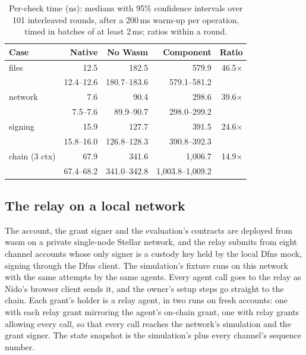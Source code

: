 \begin{table}[t]
\caption{Per-check time (ns): medians with 95\% confidence intervals over 101
interleaved rounds, after a 200\,ms warm-up per operation, timed in batches of
at least 2\,ms; ratios within a round.}\label{tab:host-cost}
\small
\setlength\tabcolsep{4pt}
\begin{tabular}{@{}lrrrr@{}}
\toprule
\textbf{Case} & \textbf{Native} & \textbf{No Wasm} & \textbf{Component} & \textbf{Ratio} \\
\midrule
files & 12.5 & 182.5 & 579.9 & 46.5$\times$ \\
 & {\scriptsize 12.4--12.6} & {\scriptsize 180.7--183.6} & {\scriptsize 579.1--581.2} & \\
network & 7.6 & 90.4 & 298.6 & 39.6$\times$ \\
 & {\scriptsize 7.5--7.6} & {\scriptsize 89.9--90.7} & {\scriptsize 298.0--299.2} & \\
signing & 15.9 & 127.7 & 391.5 & 24.6$\times$ \\
 & {\scriptsize 15.8--16.0} & {\scriptsize 126.8--128.3} & {\scriptsize 390.8--392.3} & \\
chain (3 ctx) & 67.9 & 341.6 & 1{,}006.7 & 14.9$\times$ \\
 & {\scriptsize 67.4--68.2} & {\scriptsize 341.0--342.8} & {\scriptsize 1{,}003.8--1{,}009.2} & \\
\bottomrule
\end{tabular}
\end{table}

\subsection{The relay on a local network}\label{sec:eval-network}

The account, the grant signer and the evaluation's contracts are deployed from
wasm on a private single-node Stellar network, and the relay submits from
eight channel accounts whose only signer is a custody key held by the local
Dfns mock, signing through the Dfns client. The simulation's fixture runs on
this network with the same attempts by the same agents. Every agent call goes
to the relay as Nido's browser client sends it, and the owner's setup steps go
straight to the chain. Each grant's holder is a relay agent, in two runs on
fresh accounts: one with each relay grant mirroring the agent's on-chain grant,
one with relay grants allowing every call, so that every call reaches the
network's simulation and the grant signer. The state snapshot is the
simulation's plus every channel's sequence number.

